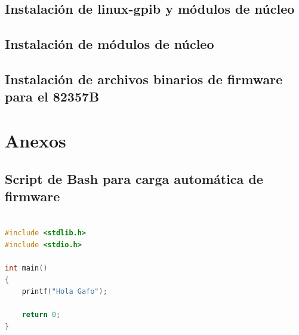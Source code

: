 \documentclass[paper=letter,oneside,fontsize=11pt, parskip=full]{scrartcl}
\begin{document}
	
		

	
		\subsection{Instalación de linux-gpib y módulos de núcleo}		
		
		\subsection{Instalación de módulos de núcleo}	
		
		\subsection{Instalación de archivos binarios de firmware para el 82357B}	

			
	\section{Anexos}	
		
		\subsection{Script de Bash para carga automática de firmware}
	
			\begin{lstlisting}[language=c,caption={Listado programa}]
	
#include <stdlib.h>
#include <stdio.h>

int main()
{
	printf("Hola Gafo");
	
	return 0;
}

		\end{lstlisting}
\end{document}
